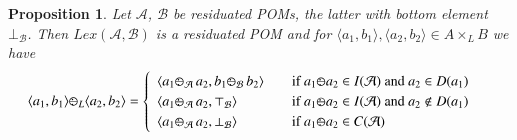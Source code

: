 \documentclass[a4paper]{elsarticle}
\newtheorem{proposition}{Proposition}
\newcommand{\1}{\mathbf{1}}
\def\odiv{{ \ominus\hspace{-8pt}:}\;}
\begin{document}
\begin{proposition}\label{def:resBI}
Let $\mathcal{A}$, $\mathcal{B}$ be residuated POMs, the latter with bottom element $\bot_\mathcal{B}$.
%
Then $Lex(\mathcal{A}, \mathcal{B})$ is a residuated POM and for $\langle a_1, b_1\rangle, \langle a_2, b_2\rangle \in A \times_L B$
we have 
\[
	\langle a_1, b_1\rangle \odiv_L \langle a_2, b_2\rangle = 	\begin{cases}
	\begin{array}{lcl}
	\langle a_1 \odiv_\mathcal{A} \, a_2, b_1  \odiv_\mathcal{B} \, b_2\rangle 
	& & \mbox{if  }  a_1 \odiv a_2 \in I(\mathcal{A}) \mbox{ and } a_2 \in D(a_1)\\
	\langle a_1 \odiv_\mathcal{A} \, a_2, \top_\mathcal{B} \rangle 
	& & \mbox{if  } a_1 \odiv a_2 \in I(\mathcal{A}) \mbox{ and } a_2 \not \in D(a_1) \\
	\langle a_1 \odiv_\mathcal{A} \, a_2, \bot_\mathcal{B} \rangle 
	& & \mbox{if  }  a_1 \odiv a_2 \in C(\mathcal{A}) 
	\end{array}
	\end{cases}
\]
\end{proposition}
\end{document}
